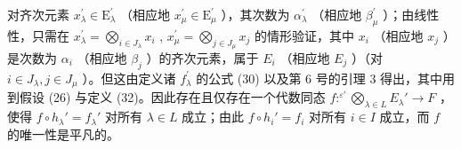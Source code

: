对齐次元素 \(x_{\lambda}^{\prime} \in \mathrm{E}_{\lambda}^{\prime}\) （相应地 \(x_{\mu}^{\prime} \in \mathrm{E}_{\mu}^{\prime}\) ），其次数为 \(\alpha_{\lambda}^{\prime}\) （相应地 \(\beta_{\mu}^{\prime}\) ）；由线性性，只需在 \(x_{\lambda}^{\prime} = \bigotimes_{i \in J_{\lambda}} x_{i}\) , \(x_{\mu}^{\prime} = \bigotimes_{j \in J_{\mu}} x_{j}\) 的情形验证，其中 \(x_{i}\) （相应地 \(x_{j}\) ）是次数为 \(\alpha_{i}\) （相应地 \(\beta_{j}\) ）的齐次元素，属于 \(E_{i}\) （相应地 \(E_{j}\) ）（对 \(i \in J_{\lambda}, j \in J_{\mu}\) ）。但这由定义诸 \(f_{\lambda}^{\prime}\) 的公式 (30) 以及第 6 号的引理 3 得出，其中用到假设 (26) 与定义 (32)。因此存在且仅存在一个代数同态 \(f: ^{\varepsilon'} \bigotimes_{\lambda \in L} E_{\lambda}' \to F\) ，使得 \(f \circ h_{\lambda}' = f_{\lambda}'\) 对所有 \(\lambda \in L\) 成立；由此 \(f \circ h_{i}' = f_{i}\) 对所有 \(i \in I\) 成立，而 \(f\) 的唯一性是平凡的。

